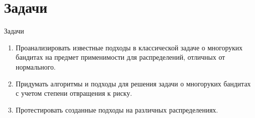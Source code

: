 \documentclass[11pt]{beamer} %
\begin{document}
\section{Задачи}
    \begin{frame}{Задачи}
        \begin{enumerate}
            \item<1-> Проанализировать известные подходы в классической задаче о многоруких бандитах на предмет применимости для распределений, отличных от нормального.
            \item<2-> Придумать алгоритмы и подходы для решения задачи о многоруких бандитах с учетом степени отвращения к риску.
            \item<3-> Протестировать созданные подходы на различных распределениях.
        \end{enumerate}
    \end{frame}

    
\end{document}
